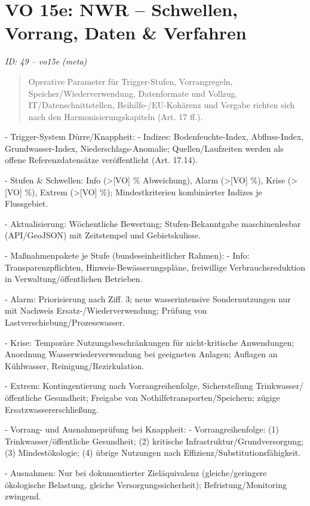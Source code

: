 \documentclass[12pt,a4paper]{scrartcl}
\begin{document}
\section[VO 15e: NWR -- Schwellen, Vorrang, Daten \& Verfahren]{VO 15e: NWR -- Schwellen, Vorrang, Daten \& Verfahren}
\noindent\textit{ID: 49 -- vo15e (meta)}

\begin{quote}
Operative Parameter für Trigger-Stufen, Vorrangregeln, Speicher/Wiederverwendung, Datenformate und Vollzug. IT/Datenschnittstellen, Beihilfe-/EU-Kohärenz und Vergabe richten sich nach den Harmonisierungskapiteln (Art. 17 ff.).
\end{quote}

- Trigger-System Dürre/Knappheit:
- Indizes: Bodenfeuchte-Index, Abfluss-Index, Grundwasser-Index, Niederschlags-Anomalie; Quellen/Laufzeiten werden als offene Referenzdatensätze veröffentlicht (Art. 17.14).

- Stufen \& Schwellen: Info (>[VO] \% Abweichung), Alarm (>[VO] \%), Krise (>[VO] \%), Extrem (>[VO] \%); Mindestkriterien kombinierter Indizes je Flussgebiet.

- Aktualisierung: Wöchentliche Bewertung; Stufen-Bekanntgabe maschinenlesbar (API/GeoJSON) mit Zeitstempel und Gebietskulisse.

- Maßnahmenpakete je Stufe (bundeseinheitlicher Rahmen):
- Info: Transparenzpflichten, Hinweis-Bewässerungspläne, freiwillige Verbrauchsreduktion in Verwaltung/öffentlichen Betrieben.

- Alarm: Priorisierung nach Ziff. 3; neue wasserintensive Sondernutzungen nur mit Nachweis Ersatz-/Wiederverwendung; Prüfung von Lastverschiebung/Prozesswasser.

- Krise: Temporäre Nutzungsbeschränkungen für nicht-kritische Anwendungen; Anordnung Wasserwiederverwendung bei geeigneten Anlagen; Auflagen an Kühlwasser, Reinigung/Rezirkulation.

- Extrem: Kontingentierung nach Vorrangreihenfolge, Sicherstellung Trinkwasser/öffentliche Gesundheit; Freigabe von Nothilfetransporten/Speichern; zügige Ersatzwassererschließung.

- Vorrang- und Ausnahmeprüfung bei Knappheit:
- Vorrangreihenfolge: (1) Trinkwasser/öffentliche Gesundheit; (2) kritische Infrastruktur/Grundversorgung; (3) Mindestökologie; (4) übrige Nutzungen nach Effizienz/Substitutionsfähigkeit.

- Ausnahmen: Nur bei dokumentierter Zieläquivalenz (gleiche/geringere ökologische Belastung, gleiche Versorgungssicherheit); Befristung/Monitoring zwingend.
\end{document}
